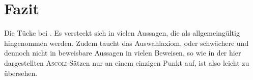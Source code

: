 \chapter{Fazit}

Die Tücke bei \AC. Es versteckt sich in vielen Aussagen, die als allgemeingültig hingenommen werden. Zudem taucht das Auswahlaxiom, oder schwächere und dennoch nicht in \ZF beweisbare Aussagen in vielen Beweisen, so wie in der hier dargestellten \textsc{Ascoli}-Sätzen nur an einem einzigen Punkt auf, ist also leicht zu übersehen.
